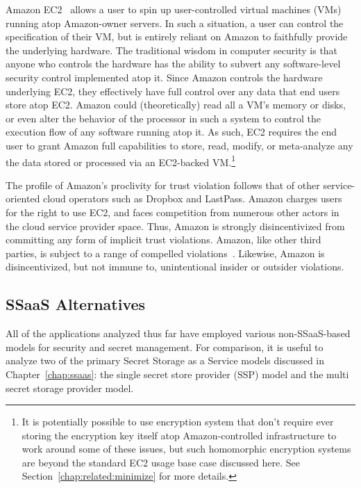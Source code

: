 Amazon EC2~\cite{amazon-ec2} allows a user to spin up user-controlled
virtual machines (VMs) running atop Amazon-owner servers. In such a
situation, a user can control the specification of their VM, but is
entirely reliant on Amazon to faithfully provide the underlying
hardware. The traditional wisdom in computer security is that anyone
who controls the hardware has the ability to subvert any
software-level security control implemented atop it. Since Amazon
controls the hardware underlying EC2, they effectively have full
control over any data that end users store atop EC2. Amazon could
(theoretically) read all a VM's memory or disks, or even alter the
behavior of the processor in such a system to control the execution
flow of any software running atop it. As such, EC2 requires the end
user to grant Amazon full capabilities to store, read, modify, or
meta-analyze any the data stored or processed via an EC2-backed
VM.\footnote{It is potentially possible to use encryption system that
  don't require ever storing the encryption key itself atop
  Amazon-controlled infrastructure to work around some of these
  issues, but such homomorphic encryption systems are beyond the
  standard EC2 usage base case discussed here. See
  Section~\ref{chap:related:minimize} for more details.}

The profile of Amazon's proclivity for trust violation follows that of
other service-oriented cloud operators such as Dropbox and
LastPass. Amazon charges users for the right to use EC2, and faces
competition from numerous other actors in the cloud service provider
space. Thus, Amazon is strongly disincentivized from committing any
form of implicit trust violations. Amazon, like other third parties,
is subject to a range of compelled
violations~\cite{amazon-transparency}. Likewise, Amazon is
disincentivized, but not immune to, unintentional insider or outsider
violations.

\subsection{SSaaS Alternatives}

All of the applications analyzed thus far have employed various
non-SSaaS-based models for security and secret management. For
comparison, it is useful to analyze two of the primary Secret Storage
as a Service models discussed in Chapter~\ref{chap:ssaas}: the single
secret store provider (SSP) model and the multi secret storage
provider model.

